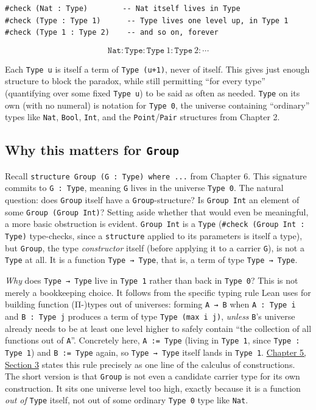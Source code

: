 \begin{lstlisting}
#check (Nat : Type)        -- Nat itself lives in Type
#check (Type : Type 1)      -- Type lives one level up, in Type 1
#check (Type 1 : Type 2)    -- and so on, forever
\end{lstlisting}

\[
\mathtt{Nat} : \mathtt{Type} : \mathtt{Type}\ 1 : \mathtt{Type}\ 2 : \cdots
\]

Each \texttt{Type u} is itself a term of \texttt{Type (u+1)}, never of itself. This gives just enough structure to block the paradox, while still permitting ``for every type'' (quantifying over some fixed \texttt{Type u}) to be said as often as needed. \texttt{Type} on its own (with no numeral) is notation for \texttt{Type 0}, the universe containing ``ordinary'' types like \texttt{Nat}, \texttt{Bool}, \texttt{Int}, and the \texttt{Point}/\texttt{Pair} structures from Chapter 2.

\subsection{\texorpdfstring{Why this matters for \texttt{Group}}{Why this matters for Group}}\label{sec:05-rigor-check:02-universes:4}

Recall \texttt{structure Group (G : Type) where ...} from Chapter 6. This signature commits to \texttt{G : Type}, meaning \texttt{G} lives in the universe \texttt{Type 0}. The natural question: does \texttt{Group} itself have a \texttt{Group}-structure? Is \texttt{Group Int} an element of some \texttt{Group (Group Int)}? Setting aside whether that would even be meaningful, a more basic obstruction is evident. \texttt{Group Int} is a \texttt{Type} (\texttt{\#check (Group Int : Type)} type-checks, since a \texttt{structure} applied to its parameters is itself a type), but \texttt{Group}, the type \emph{constructor} itself (before applying it to a carrier \texttt{G}), is not a \texttt{Type} at all. It is a function \texttt{Type → Type}, that is, a term of type \texttt{Type → Type}.

\emph{Why} does \texttt{Type → Type} live in \texttt{Type 1} rather than back in \texttt{Type 0}? This is not merely a bookkeeping choice. It follows from the specific typing rule Lean uses for building function (Π-)types out of universes: forming \texttt{A → B} when \texttt{A : Type i} and \texttt{B : Type j} produces a term of type \texttt{Type (max i j)}, \emph{unless} \texttt{B}'s universe already needs to be at least one level higher to safely contain ``the collection of all functions out of \texttt{A}''. Concretely here, \texttt{A := Type} (living in \texttt{Type 1}, since \texttt{Type : Type 1}) and \texttt{B := Type} again, so \texttt{Type → Type} itself lands in \texttt{Type 1}. \hyperref[sec:05-rigor-check:03-typing-rules-and-safety:1]{Chapter 5, Section 3} states this rule precisely as one line of the calculus of constructions. The short version is that \texttt{Group} is not even a candidate carrier type for its own construction. It sits one universe level too high, exactly because it is a function \emph{out of} \texttt{Type} itself, not out of some ordinary \texttt{Type 0} type like \texttt{Nat}.

